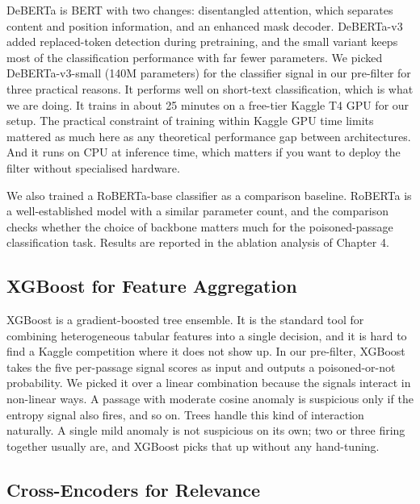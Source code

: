 DeBERTa \citep{he2021deberta} is BERT with two changes: disentangled attention, which separates content and position information, and an enhanced mask decoder. DeBERTa-v3 added replaced-token detection during pretraining, and the small variant keeps most of the classification performance with far fewer parameters. We picked DeBERTa-v3-small (140M parameters) for the classifier signal in our pre-filter for three practical reasons. It performs well on short-text classification, which is what we are doing. It trains in about 25 minutes on a free-tier Kaggle T4 GPU for our setup. The practical constraint of training within Kaggle GPU time limits mattered as much here as any theoretical performance gap between architectures. And it runs on CPU at inference time, which matters if you want to deploy the filter without specialised hardware.

We also trained a RoBERTa-base classifier \citep{liu2019roberta} as a comparison baseline. RoBERTa is a well-established model with a similar parameter count, and the comparison checks whether the choice of backbone matters much for the poisoned-passage classification task. Results are reported in the ablation analysis of Chapter 4.

\subsection{XGBoost for Feature Aggregation}

XGBoost \citep{chen2016xgboost} is a gradient-boosted tree ensemble. It is the standard tool for combining heterogeneous tabular features into a single decision, and it is hard to find a Kaggle competition where it does not show up. In our pre-filter, XGBoost takes the five per-passage signal scores as input and outputs a poisoned-or-not probability. We picked it over a linear combination because the signals interact in non-linear ways. A passage with moderate cosine anomaly is suspicious only if the entropy signal also fires, and so on. Trees handle this kind of interaction naturally. A single mild anomaly is not suspicious on its own; two or three firing together usually are, and XGBoost picks that up without any hand-tuning.

\subsection{Cross-Encoders for Relevance}


